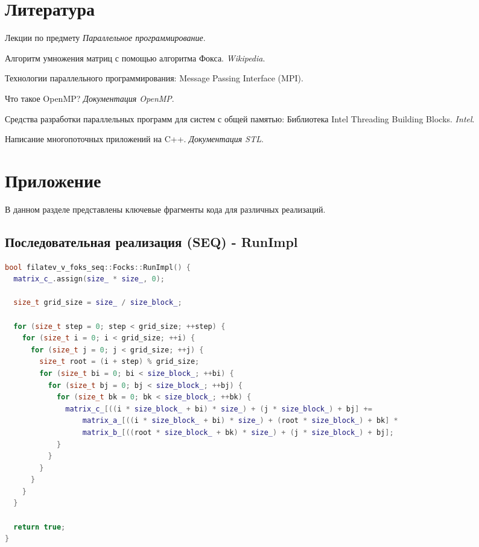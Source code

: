 \documentclass[12pt]{article}
\begin{document}
\newpage
\section{Литература}
\begin{thebibliography}{99}
    Лекции по предмету \textit{Параллельное программирование}.
    
    Алгоритм умножения матриц с помощью алгоритма Фокса. \textit{Wikipedia}. 
    
    Технологии параллельного программирования: Message Passing Interface (MPI).
    
    Что такое OpenMP? \textit{Документация OpenMP}.
    
    Средства разработки параллельных программ для систем с общей памятью: Библиотека Intel Threading Building Blocks. \textit{Intel}.
    
    Написание многопоточных приложений на C++. \textit{Документация STL}.
\end{thebibliography}


\newpage
\section{Приложение}

В данном разделе представлены ключевые фрагменты кода для различных реализаций.

\subsection{Последовательная реализация (SEQ) - RunImpl}
\begin{lstlisting}[language=C++]
bool filatev_v_foks_seq::Focks::RunImpl() {
  matrix_c_.assign(size_ * size_, 0);

  size_t grid_size = size_ / size_block_;

  for (size_t step = 0; step < grid_size; ++step) {
    for (size_t i = 0; i < grid_size; ++i) {
      for (size_t j = 0; j < grid_size; ++j) {
        size_t root = (i + step) % grid_size;
        for (size_t bi = 0; bi < size_block_; ++bi) {
          for (size_t bj = 0; bj < size_block_; ++bj) {
            for (size_t bk = 0; bk < size_block_; ++bk) {
              matrix_c_[((i * size_block_ + bi) * size_) + (j * size_block_) + bj] +=
                  matrix_a_[((i * size_block_ + bi) * size_) + (root * size_block_) + bk] *
                  matrix_b_[((root * size_block_ + bk) * size_) + (j * size_block_) + bj];
            }
          }
        }
      }
    }
  }

  return true;
}
\end{lstlisting}
\newpage
\end{document}
